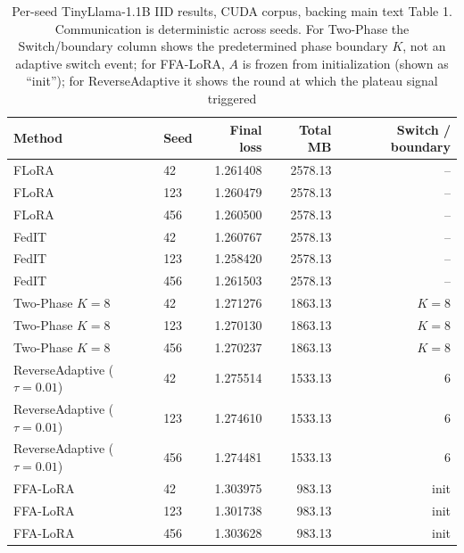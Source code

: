 \documentclass[pdflatex,sn-nature]{sn-jnl}
\begin{document}
\begin{table}[tbp]
\centering
\footnotesize
\scriptsize
\renewcommand{\arraystretch}{0.78}
\setlength{\tabcolsep}{6pt}
\caption{Per-seed TinyLlama-1.1B IID results, CUDA corpus, backing main text Table 1. Communication is deterministic across seeds. For Two-Phase the Switch/boundary column shows the predetermined phase boundary $K$, not an adaptive switch event; for FFA-LoRA, $A$ is frozen from initialization (shown as ``init''); for ReverseAdaptive it shows the round at which the plateau signal triggered}
\label{tab:b1}
\begin{tabular}{@{}llrrr@{}}
\toprule
Method & Seed & Final loss & Total MB & Switch / boundary \\
\midrule
FLoRA & 42 & 1.261408 & 2578.13 & -- \\
FLoRA & 123 & 1.260479 & 2578.13 & -- \\
FLoRA & 456 & 1.260500 & 2578.13 & -- \\
FedIT & 42 & 1.260767 & 2578.13 & -- \\
FedIT & 123 & 1.258420 & 2578.13 & -- \\
FedIT & 456 & 1.261503 & 2578.13 & -- \\
Two-Phase $K{=}8$ & 42 & 1.271276 & 1863.13 & $K{=}8$ \\
Two-Phase $K{=}8$ & 123 & 1.270130 & 1863.13 & $K{=}8$ \\
Two-Phase $K{=}8$ & 456 & 1.270237 & 1863.13 & $K{=}8$ \\
ReverseAdaptive ($\tau{=}0.01$) & 42 & 1.275514 & 1533.13 & 6 \\
ReverseAdaptive ($\tau{=}0.01$) & 123 & 1.274610 & 1533.13 & 6 \\
ReverseAdaptive ($\tau{=}0.01$) & 456 & 1.274481 & 1533.13 & 6 \\
FFA-LoRA & 42 & 1.303975 & 983.13 & init \\
FFA-LoRA & 123 & 1.301738 & 983.13 & init \\
FFA-LoRA & 456 & 1.303628 & 983.13 & init \\
\bottomrule
\end{tabular}
\end{table}
\end{document}
